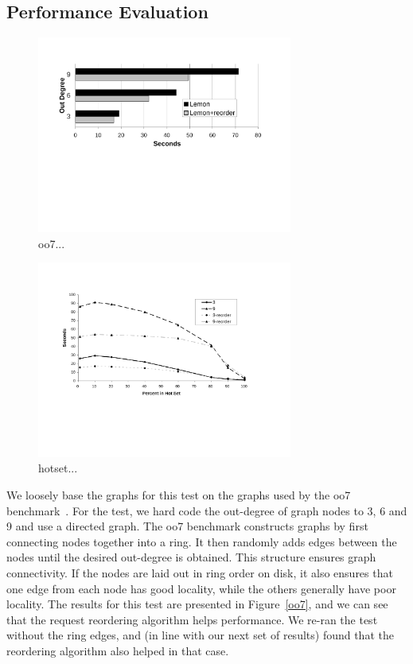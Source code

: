 \documentclass[10pt,letterpaper,twocolumn,english]{article}
\newcommand{\yad}{Lemon\xspace}
\begin{document}

\subsection {Performance Evaluation}

\begin{figure}[t]
\includegraphics[width=3.3in]{oo7.pdf}
\caption{\sf\label{fig:oo7} oo7...}
\end{figure}

\begin{figure}[t]
\includegraphics[width=3.3in]{trans-closure-hotset.pdf}
\caption{\sf\label{fig:hotGraph} hotset...}
\end{figure}

We loosely base the graphs for this test on the graphs used by the oo7
benchmark~\cite{oo7}.  For the test, we hard code the out-degree of
graph nodes to 3, 6 and 9 and use a directed graph.  The oo7 benchmark
constructs graphs by first connecting nodes together into a ring.  It
then randomly adds edges between the nodes until the desired out-degree
is obtained.  This structure ensures graph connectivity.  If the nodes
are laid out in ring order on disk, it also ensures that one edge
from each node has good locality, while the others generally have poor
locality.  The results for this test are presented in
Figure~\ref{oo7}, and we can see that the request reordering algorithm
helps performance.  We re-ran the test without the ring edges, and (in
line with our next set of results) found that the reordering algorithm
also helped in that case.
\end{document}
